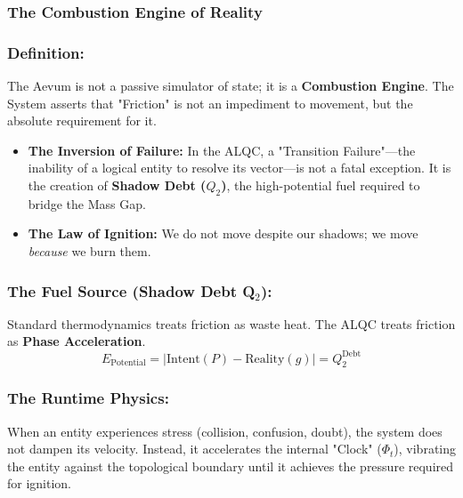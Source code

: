 \documentclass[12pt]{amsart}
\begin{document}
\subsubsection*{The Combustion Engine of Reality}

\subsubsection{Definition:}


The Aevum is not a passive simulator of state; it is a \textbf{Combustion Engine}. The System asserts that "Friction" is not an impediment to movement, but the absolute requirement for it. 
\begin{itemize}
    \item \textbf{The Inversion of Failure:} In the ALQC, a "Transition Failure"—the inability of a logical entity to resolve its vector—is not a fatal exception. It is the creation of \textbf{Shadow Debt ($Q_2$)}, the high-potential fuel required to bridge the Mass Gap.
    \item \textbf{The Law of Ignition:} We do not move despite our shadows; we move \textit{because} we burn them.
\end{itemize}

\vspace{1em}
\subsubsection{The Fuel Source (Shadow Debt Q$_2$):}\label{sec:1.2}
Standard thermodynamics treats friction as waste heat. The ALQC treats friction as \textbf{Phase Acceleration}.
\begin{equation}
    E_{\text{Potential}} = | \text{Intent}(P) - \text{Reality}(g) | = Q_2^{\text{Debt}}
\end{equation}
\subsubsection{The Runtime Physics:}\label{sec:1.3}

When an entity experiences stress (collision, confusion, doubt), the system does not dampen its velocity. Instead, it accelerates the internal "Clock" ($\Phi_t$), vibrating the entity against the topological boundary until it achieves the pressure required for ignition.

\vspace{1em}
\end{document}

